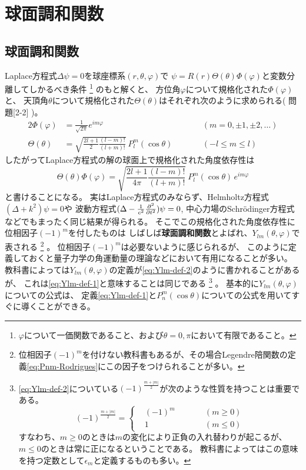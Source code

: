 \documentclass[../main/main]{subfiles}
\begin{document}
\section{球面調和関数}

\subsection{球面調和関数}
Laplace方程式$\Delta \psi = 0$を球座標系$(r, \theta, \varphi)$で
$\psi = R(r) \Theta(\theta) \Phi (\varphi)$と変数分離してしかるべき条件
\footnote{
$\varphi$について一価関数であること、および$\theta=0, \pi$において有限であること。

}
のもと解くと、
方位角$\varphi$について規格化された$\Phi (\varphi)$と、
天頂角$\theta$について規格化された$\Theta(\theta)$はそれぞれ次のように求められる( 問題[2-2] )。
\begin{alignat}{2}
  \Phi (\varphi) &= \frac{1}{\sqrt{2\pi}} e^{im\varphi} && (m = 0, \pm1, \pm2, \dots) \\
  \Theta(\theta) &= \sqrt{\frac{2l+1}{2} \frac{(l-m)!}{(l+m)!}} \ P_l^m (\cos\theta) &\qquad
	&(-l \leq m \leq l)
\end{alignat}
したがってLaplace方程式の解の球面上で規格化された角度依存性は
\begin{equation*}
  \Theta(\theta) \Phi (\varphi)
	= \sqrt{\frac{2l+1}{4\pi} \frac{(l-m)!}{(l+m)!}} \ P_l^m(\cos\theta) \, e^{im\varphi}
\end{equation*}
と書けることになる。
実はLaplace方程式のみならず、Helmholtz方程式$(\Delta + k^2) \psi = 0$や
波動方程式$(\Delta - \frac{1}{c^2} \frac{\partial^2}{\partial t^2}) \psi = 0$, 
中心力場のSchr\"{o}dinger方程式などでもまったく同じ結果が得られる。
そこでこの規格化された角度依存性に位相因子$(-1)^m$を付したものは
しばしば\textbf{球面調和関数}とよばれ、$Y_{lm}(\theta, \varphi)$で表される
\footnote{
位相因子$(-1)^m$を付けない教科書もあるが、その場合Legendre陪関数の定義\eqref{eq:Pnm-Rodrigues}にこの因子をつけられることが多い。
}
。
位相因子$(-1)^m$は必要ないように感じられるが、
このように定義しておくと量子力学の角運動量の理論などにおいて有用になることが多い。
教科書によっては$Y_{lm}(\theta, \varphi)$の定義が\eqref{eq:Ylm-def-2}のように書かれることがあるが、
これは\eqref{eq:Ylm-def-1}と意味することは同じである
\footnote{
\eqref{eq:Ylm-def-2}についている$(-1)^{\frac{m+|m|}{2}}$が次のような性質を持つことは重要である。
\begin{equation}
  (-1)^{\frac{m+|m|}{2}} = \left\{
  \begin{alignedat}{2}
    &(-1)^m 	& \qquad &(m\geq 0) \\
    &1 		& 		& (m \leq 0)
  \end{alignedat}
  \right.
\end{equation}
すなわち、$m \geq 0$のときは$m$の変化により正負の入れ替わりが起こるが、
$m\leq0$のときは常に正になるということである。
教科書によってはこの意味を持つ定数として$\epsilon_m$と定義するものも多い。
}
。
基本的に$Y_{lm}(\theta, \varphi)$についての公式は、
定義\eqref{eq:Ylm-def-1}と$P_n^m(\cos\theta)$についての公式を用いてすぐに導くことができる。
\end{document}
